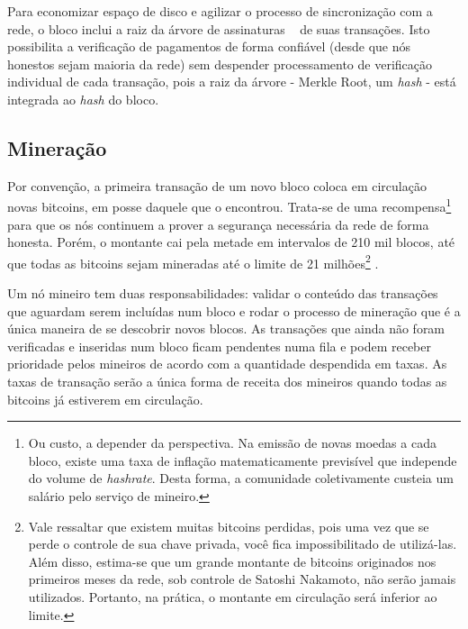 \documentclass[a4paper,12pt]{monografia}
\theoremstyle{plain}
\theoremstyle{definition}
\theoremstyle{remark}
\begin{document}
Para economizar espa\c{c}o de disco e agilizar o processo de sincroniza\c{c}\~ao com a rede, o bloco inclui a raiz da \'arvore de assinaturas ~\cite{merkle} de suas transa\c{c}\~oes. Isto possibilita a verifica\c{c}\~ao de pagamentos de forma confi\'avel (desde que n\'os honestos sejam maioria da rede) sem despender processamento de verifica\c{c}\~ao individual de cada transa\c{c}\~ao, pois a raiz da \'arvore - Merkle Root, um \textit{hash} - est\'a integrada ao \textit{hash} do bloco.

\subsection{Minera\c{c}\~ao}

Por conven\c{c}\~ao, a primeira transa\c{c}\~ao de um novo bloco coloca em circula\c{c}\~ao novas bitcoins, em posse daquele que o encontrou.
Trata-se de uma recompensa\footnote{Ou custo, a depender da perspectiva. Na emiss\~ao de novas moedas a cada bloco, existe uma taxa de infla\c{c}\~ao matematicamente previs\'ivel que independe do volume de \textit{hashrate}. Desta forma, a comunidade coletivamente custeia um sal\'ario pelo servi\c{c}o de mineiro.} para que os n\'os continuem a prover a seguran\c{c}a necess\'aria da rede de forma honesta.
Por\'em, o montante cai pela metade em intervalos de 210 mil blocos, at\'e que todas as bitcoins sejam mineradas at\'e o limite de 21 milh\~oes\footnote{Vale ressaltar que existem muitas bitcoins perdidas, pois uma vez que se perde o controle de sua chave privada, voc\^e fica impossibilitado de utiliz\'a-las.
Al\'em disso, estima-se que um grande montante de bitcoins originados nos primeiros meses da rede, sob controle de Satoshi Nakamoto, n\~ao ser\~ao jamais utilizados.
Portanto, na pr\'atica, o montante em circula\c{c}\~ao ser\'a inferior ao limite.} \cite{bitcoin}.

Um n\'o mineiro tem duas responsabilidades: validar o conte\'udo das transa\c{c}\~oes que aguardam serem inclu\'idas num bloco e rodar o processo de minera\c{c}\~ao que \'e a \'unica maneira de se descobrir novos blocos.
As transa\c{c}\~oes que ainda n\~ao foram verificadas e inseridas num bloco ficam pendentes numa fila e podem receber prioridade pelos mineiros de acordo com a quantidade despendida em taxas.
As taxas de transa\c{c}\~ao ser\~ao a \'unica forma de receita dos mineiros quando todas as bitcoins j\'a estiverem em circula\c{c}\~ao.
\end{document}

